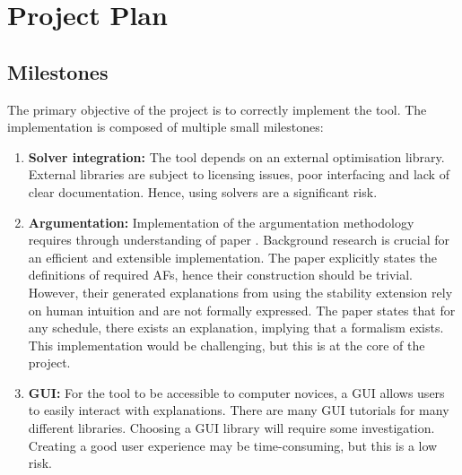 \chapter{Project Plan}

\section{Milestones}

The primary objective of the project is to correctly implement the tool. The implementation is composed of multiple small milestones:

\begin{enumerate}
	\item\textbf{Solver integration:} The tool depends on an external optimisation library. External libraries are subject to licensing issues, poor interfacing and lack of clear documentation. Hence, using solvers are a significant risk.
	\item\textbf{Argumentation:} Implementation of the argumentation methodology requires through understanding of paper \cite{aes}. Background research is crucial for an efficient and extensible implementation. The paper explicitly states the definitions of required AFs, hence their construction should be trivial. However, their generated explanations from using the stability extension rely on human intuition and are not formally expressed. The paper states that for any schedule, there exists an explanation, implying that a formalism exists. This implementation would be challenging, but this is at the core of the project.
	\item\textbf{GUI:} For the tool to be accessible to computer novices, a GUI allows users to easily interact with explanations. There are many GUI tutorials for many different libraries. Choosing a GUI library will require some investigation. Creating a good user experience may be time-consuming, but this is a low risk.
\end{enumerate}

